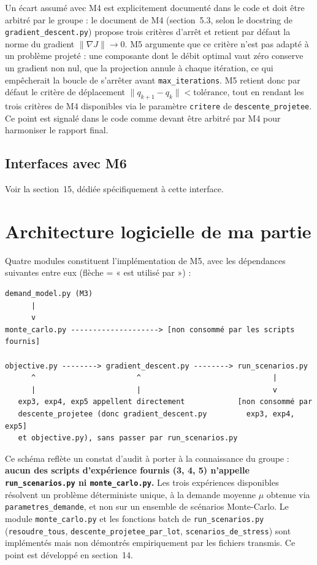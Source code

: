 \documentclass[11pt,a4paper]{article}
\begin{document}
Un écart assumé avec M4 est explicitement documenté dans le code et doit
être arbitré par le groupe : le document de M4 (section~5.3, selon le
docstring de \texttt{gradient\_descent.py}) propose trois critères d'arrêt et
retient par défaut la norme du gradient $\lVert \nabla J \rVert \to 0$. M5
argumente que ce critère n'est pas adapté à un problème projeté : une
composante dont le débit optimal vaut zéro conserve un gradient non nul, que
la projection annule à chaque itération, ce qui empêcherait la boucle de
s'arrêter avant \texttt{max\_iterations}. M5 retient donc par défaut le
critère de déplacement $\lVert q_{k+1} - q_k \rVert < \text{tolérance}$, tout
en rendant les trois critères de M4 disponibles via le paramètre
\texttt{critere} de \texttt{descente\_projetee}. Ce point est signalé dans le
code comme devant être arbitré par M4 pour harmoniser le rapport final.

\subsection{Interfaces avec M6}

Voir la section~15, dédiée spécifiquement à cette interface.

\section{Architecture logicielle de ma partie}

Quatre modules constituent l'implémentation de M5, avec les dépendances
suivantes entre eux (flèche = « est utilisé par ») :

\begin{verbatim}
demand_model.py (M3)
      |
      v
monte_carlo.py --------------------> [non consommé par les scripts fournis]

objective.py --------> gradient_descent.py --------> run_scenarios.py
      ^                       ^                              |
      |                       |                              v
   exp3, exp4, exp5 appellent directement            [non consommé par
   descente_projetee (donc gradient_descent.py         exp3, exp4, exp5]
   et objective.py), sans passer par run_scenarios.py
\end{verbatim}

Ce schéma reflète un constat d'audit à porter à la connaissance du groupe :
\textbf{aucun des scripts d'expérience fournis (3, 4, 5) n'appelle
\texttt{run\_scenarios.py} ni \texttt{monte\_carlo.py}.} Les trois
expériences disponibles résolvent un problème déterministe unique, à la
demande moyenne $\mu$ obtenue via \texttt{parametres\_demande}, et non sur un
ensemble de scénarios Monte-Carlo. Le module \texttt{monte\_carlo.py} et les
fonctions batch de \texttt{run\_scenarios.py} (\texttt{resoudre\_tous},
\texttt{descente\_projetee\_par\_lot}, \texttt{scenarios\_de\_stress}) sont
implémentés mais non démontrés empiriquement par les fichiers transmis. Ce
point est développé en section~14.
\end{document}
